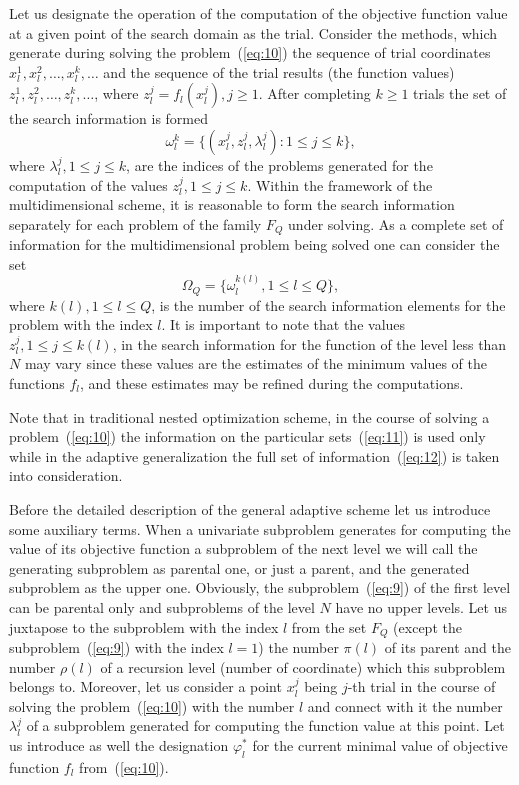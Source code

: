 \documentclass[smallextended]{svjour3}
\let\origref\ref
\renewcommand{\ref}[1]{(\origref{#1})}
\begin{document}
Let us designate the operation of the computation of the objective function value at a given point of the search domain as the trial. Consider the methods, which generate during solving the problem~\ref{eq:10} the sequence of trial coordinates $x_l^1, x_l^2, \dots, x_l^k, \dots$ and the sequence of the trial results (the function values) $z_l^1, z_l^2, \dots, z_l^k, \dots$, where $z_l^j = f_l(x_l^j), j \geq 1$. After completing $k \geq 1$ trials the set of the search information is formed
\begin{equation}
\label{eq:11}
\omega_l^k = \big\{ (x_l^j, z_l^j, \lambda_l^j): 1 \leq j \leq k \big\},
\end{equation}
%
where $\lambda_l^j, 1 \leq j \leq k$, are the indices of the problems generated for the computation of the values $z_l^j, 1 \leq j \leq k$. Within the framework of the multidimensional scheme, it is reasonable to form the search information separately for each problem of the family $F_Q$ under solving. As a complete set of information for the multidimensional problem being solved one can consider the set
\begin{equation*}
\Omega_Q = \big\{ \omega_l^{k(l)}, 1 \leq l \leq Q \big\},
\end{equation*}
%
where $k(l), 1 \leq l \leq Q$, is the number of the search information elements for the problem with the index $l$. It is important to note that the values $z_l^j, 1 \leq j \leq k(l)$, in the search information for the function of the level less than $N$ may vary since these values are the estimates of the minimum values of the functions $f_l$, and these estimates may be refined during the computations.

Note that in traditional nested optimization scheme, in the course of solving a problem~\ref{eq:10} the information on the particular sets~\ref{eq:11} is used only while in the adaptive generalization the full set of information~\ref{eq:12} is taken into consideration.

Before the detailed description of the general adaptive scheme let us introduce some auxiliary terms. When a univariate subproblem generates for computing the value of its objective function a subproblem of the next level we will call the generating subproblem as parental one, or just a parent, and the generated subproblem as the upper one. Obviously, the subproblem~\ref{eq:9} of the first level can be parental only and subproblems of the level $N$ have no upper levels. Let us juxtapose to the subproblem with the index $l$ from the set $F_Q$ (except the subproblem~\ref{eq:9} with the index $l = 1$) the number $\pi(l)$ of its parent and the number $\rho(l)$ of a recursion level (number of coordinate) which this subproblem belongs to. Moreover, let us consider a point $x_l^j$ being $j$-th trial in the course of solving the problem~\ref{eq:10} with the number $l$ and connect with it the number $\lambda_l^j$ of a subproblem generated for computing the function value at this point. Let us introduce as well the designation $\varphi_l^*$ for the current minimal value of objective function $f_l$ from~\ref{eq:10}.
\end{document}
